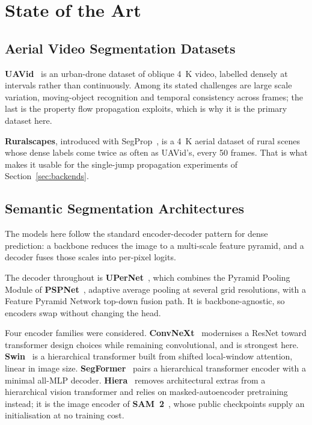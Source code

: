 \documentclass[report.tex]{subfiles}
\begin{document}
\chapter{State of the Art}
\label{ch:sota}

\section{Aerial Video Segmentation Datasets}
\label{sec:sota-data}

\textbf{UAVid}~\cite{uavid2020} is an urban-drone dataset of oblique
\SI{4}{K} video, labelled densely at intervals rather than continuously. Among
its stated challenges are large scale variation, moving-object recognition and
temporal consistency across frames; the last is the property flow propagation
exploits, which is why it is the primary dataset here.

\textbf{Ruralscapes}, introduced with SegProp~\cite{segprop2020}, is a
\SI{4}{K} aerial dataset of rural scenes whose dense labels come twice as
often as UAVid's, every 50 frames. That is what makes it usable for the
single-jump propagation experiments of Section~\ref{sec:backends}.

\section{Semantic Segmentation Architectures}
\label{sec:sota-arch}

The models here follow the standard encoder-decoder pattern for dense
prediction: a backbone reduces the image to a multi-scale feature pyramid, and
a decoder fuses those scales into per-pixel logits.

The decoder throughout is \textbf{UPerNet}~\cite{upernet2018}, which combines
the Pyramid Pooling Module of \textbf{PSPNet}~\cite{pspnet2017}, adaptive
average pooling at several grid resolutions, with a Feature Pyramid Network
top-down fusion path. It is backbone-agnostic, so encoders swap without
changing the head.

Four encoder families were considered. \textbf{ConvNeXt}~\cite{convnext2022}
modernises a ResNet toward transformer design choices while remaining
convolutional, and is strongest here. \textbf{Swin}~\cite{swin2021} is a
hierarchical transformer built from shifted local-window attention, linear in
image size. \textbf{SegFormer}~\cite{segformer2021} pairs a hierarchical
transformer encoder with a minimal all-MLP decoder.
\textbf{Hiera}~\cite{hiera2023} removes architectural extras from a
hierarchical vision transformer and relies on masked-autoencoder pretraining
instead; it is the image encoder of \textbf{SAM~2}~\cite{sam2_2024}, whose
public checkpoints supply an initialisation at no training cost.
\end{document}
